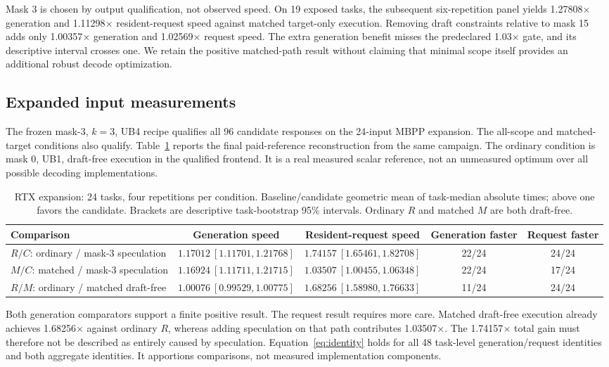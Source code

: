 \documentclass{article}
\begin{document}
Mask 3 is chosen by output qualification, not observed speed. On 19 exposed tasks, the subsequent six-repetition panel yields 1.27808$\times$ generation and 1.11298$\times$ resident-request speed against matched target-only execution. Removing draft constraints relative to mask 15 adds only 1.00357$\times$ generation and 1.02569$\times$ request speed. The extra generation benefit misses the predeclared 1.03$\times$ gate, and its descriptive interval crosses one. We retain the positive matched-path result without claiming that minimal scope itself provides an additional robust decode optimization.

\subsection{Expanded input measurements}
The frozen mask-3, $k=3$, UB4 recipe qualifies all 96 candidate responses on the 24-input MBPP expansion. The all-scope and matched-target conditions also qualify. Table~\ref{tab:cost} reports the final paid-reference reconstruction from the same campaign. The ordinary condition is mask 0, UB1, draft-free execution in the qualified frontend. It is a real measured scalar reference, not an unmeasured optimum over all possible decoding implementations.

\begin{table}[t]
\centering\small\setlength{\tabcolsep}{3pt}
\caption{RTX expansion: 24 tasks, four repetitions per condition. Baseline/candidate geometric mean of task-median absolute times; above one favors the candidate. Brackets are descriptive task-bootstrap 95\% intervals. Ordinary $R$ and matched $M$ are both draft-free.}
\label{tab:cost}
\begin{tabular}{lcccc}\toprule
Comparison & Generation speed & Resident-request speed & Generation faster & Request faster\\\midrule
$R/C$: ordinary / mask-3 speculation & $1.17012\ [1.11701,1.21768]$ & $1.74157\ [1.65461,1.82708]$ & 22/24 & 24/24\\
$M/C$: matched / mask-3 speculation & $1.16924\ [1.11711,1.21715]$ & $1.03507\ [1.00455,1.06348]$ & 22/24 & 17/24\\
$R/M$: ordinary / matched draft-free & $1.00076\ [0.99529,1.00775]$ & $1.68256\ [1.58980,1.76633]$ & 11/24 & 24/24\\\bottomrule
\end{tabular}
\end{table}

Both generation comparators support a finite positive result. The request result requires more care. Matched draft-free execution already achieves 1.68256$\times$ against ordinary $R$, whereas adding speculation on that path contributes 1.03507$\times$. The 1.74157$\times$ total gain must therefore not be described as entirely caused by speculation. Equation~\ref{eq:identity} holds for all 48 task-level generation/request identities and both aggregate identities. It apportions comparisons, not measured implementation components.
\end{document}
